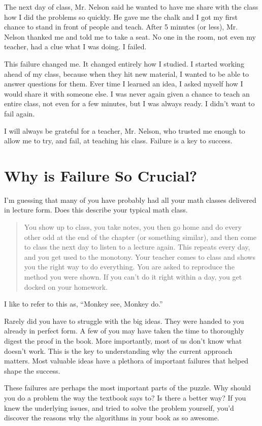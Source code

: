 \documentclass[letterpaper,oneside]{book}%
\theoremstyle{plain}
\theoremstyle{box}
\theoremstyle{problem}
\begin{document}
The next day of class, Mr. Nelson said he wanted to have me share with the class how I did the problems so quickly. He gave me the chalk and I got my first chance to stand in front of people and teach. After 5 minutes (or less), Mr. Nelson thanked me and told me to take a seat.  No one in the room, not even my teacher, had a clue what I was doing.  I failed. 

This failure changed me. It changed entirely how I studied. I started working ahead of my class, because when they hit new material, I wanted to be able to answer questions for them. Ever time I learned an idea, I asked myself how I would share it with someone else. I was never again given a chance to teach an entire class, not even for a few minutes, but I was always ready. I didn't want to fail again.

I will always be grateful for a teacher, Mr. Nelson, who trusted me enough to allow me to try, and fail, at teaching his class. Failure is a key to success. 

\section*{Why is Failure So Crucial?}
I'm guessing that many of you have probably had all your math classes delivered in lecture form.  Does this describe your typical math class. 
\begin{quote}
You show up to class, you take notes, you then go home and do every other odd at the end of the chapter (or something similar), and then come to class the next day to listen to a lecture again.  This repeats every day, and you get used to the monotony.  Your teacher comes to class and shows you the right way to do everything. You are asked to reproduce the method you were shown. If you can't do it right within a day, you get docked on your homework. 
\end{quote}
I like to refer to this as, ``Monkey see, Monkey do.'' 

Rarely did you have to struggle with the big ideas. They were handed to you already in perfect form. 
A few of you may have taken the time to thoroughly digest the proof in the book.  
More importantly, most of us don't know what doesn't work. This is the key to understanding why the current approach matters. 
Most valuable ideas have a plethora of important failures that helped shape the success.   

These failures are perhaps the most important parts of the puzzle. 
Why should you do a problem the way the textbook says to? 
Is there a better way? 
If you knew the underlying issues, and tried to solve the problem yourself, you'd discover the reasons why the algorithms in your book as so awesome. 
\end{document}

